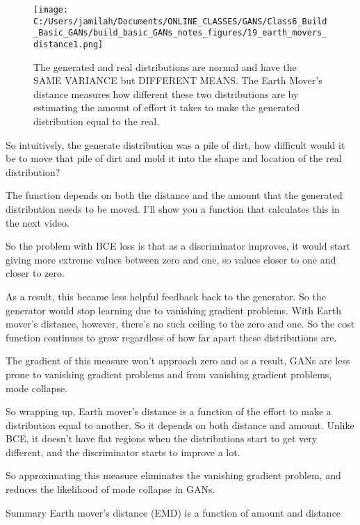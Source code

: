 \documentclass[11pt, onecolumn]{article}
\begin{document}
\begin{figure}[htp]
\begin{center}
\texttt{[image: C:/Users/jamilah/Documents/ONLINE\_CLASSES/GANS/Class6\_Build\_Basic\_GANs/build\_basic\_GANs\_notes\_figures/19\_earth\_movers\_distance1.png]}
\end{center}
\caption{The generated and real distributions are normal and have the SAME VARIANCE but DIFFERENT MEANS. The Earth Mover's distance measures how different these two distributions are by estimating the amount of effort it takes to make the generated distribution equal to the real. }
\label{19_earth_movers_distance1}
\end{figure}

So intuitively, the generate distribution was a pile of dirt, how difficult would it be to move that pile of dirt and
mold it into the shape and location of the real distribution?


The function depends on both the distance and the amount that the generated distribution needs to be moved.
I'll show you a function that
calculates this in the next video.

So the problem with BCE loss is that as a discriminator improves, it would start giving more extreme values between zero and one, so values closer to one and closer to zero.

As a result, this became less helpful feedback back to the generator.
So the generator would stop learning due to vanishing gradient problems.
With Earth mover's distance, however, there's no such ceiling to the zero and one.
So the cost function continues to grow regardless of how far apart these distributions are.

The gradient of this measure won't approach zero and as a result, GANs are less prone to vanishing gradient problems and
from vanishing gradient problems, mode collapse.

So wrapping up, Earth mover's distance is a function of the effort to make a distribution equal to another.
So it depends on both distance and amount.
Unlike BCE, it doesn't have flat regions when the distributions start to get very different, and the discriminator starts to improve a lot.

So approximating this measure eliminates the vanishing gradient problem, and reduces the likelihood of mode collapse in GANs.

Summary
Earth mover's distance (EMD) is a function of amount and distance
\end{document}
